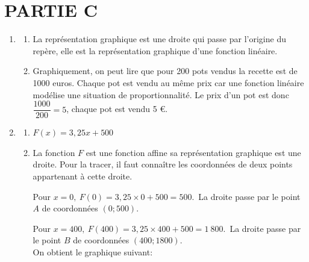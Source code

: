 \section*{\hspace{20mm}\textbf{PARTIE C}}
\begin{enumerate}
    \item 
    \begin{enumerate}
        \item La représentation graphique est une droite qui passe par l’origine du repère, elle est la représentation graphique d’une fonction linéaire.
        \item Graphiquement, on peut lire que pour 200 pots vendus la recette est de 1000 euros. Chaque pot est vendu au même prix car une fonction linéaire modélise une situation de proportionnalité. Le prix d’un pot est donc $\dfrac{1000}{200}=5$, chaque pot est vendu 5 €.
    \end{enumerate}
    \item
    \begin{enumerate}
        \item $F(x)=3,25x+500$
        \item La fonction $F$ est une fonction affine sa représentation graphique est une droite. Pour la tracer, il faut connaître les coordonnées de deux points appartenant à cette droite.
        
        \medskip
        Pour $x=0,~F(0)=3,25\times0+500=500$.~La droite passe par le point $A$ de coordonnées $(0 ; 500)$.
        
        \medskip
        Pour $x=400,~F(400)=3,25\times400+500=1~800$.~La droite passe par le point $B$ de coordonnées $(400 ; 1800)$.\\On obtient le graphique suivant:\\ 
        
 

\end{enumerate}
\end{enumerate}
